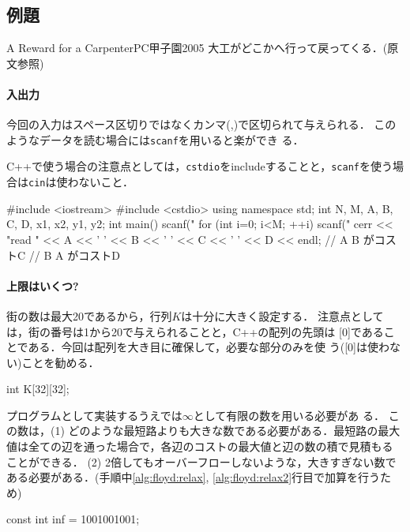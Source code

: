 \subsection{例題}

\begin{psbox}{A Reward for a Carpenter}{PC甲子園2005}
大工がどこかへ行って戻ってくる．(原文参照)
  
\end{psbox}

\paragraph{入出力}
今回の入力はスペース区切りではなくカンマ(,)で区切られて与えられる．
このようなデータを読む場合には\texttt{scanf}を用いると楽ができ
る．

C++で使う場合の注意点としては，\texttt{cstdio}をincludeすることと，\texttt{scanf}を使う場合は\texttt{cin}は使わないこと．

\begin{cbox}
#include <iostream>
#include <cstdio>
using namespace std;
int N, M, A, B, C, D, x1, x2, y1, y2;
int main() {
    scanf("
    for (int i=0; i<M; ++i) {
        scanf("
        cerr << "read " << A << ' ' << B << ' ' << C << ' ' << D
             << endl;
        // A \dingright{} B がコストC
        // B \dingright{} A がコストD
    }
}
\end{cbox}


\paragraph{上限はいくつ?}

街の数は最大20であるから，行列$K$は十分に大きく設定する．
注意点としては，街の番号は1から20で与えられることと，C++の配列の先頭は
[0]であることである．今回は配列を大き目に確保して，必要な部分のみを使
う([0]は使わない)ことを勧める．


\begin{cbox}
int K[32][32];
\end{cbox}


プログラムとして実装するうえでは$\infty$として有限の数を用いる必要があ
る．
この数は，(1) どのような最短路よりも大きな数である必要がある．最短路の最大
値は全ての辺を通った場合で，各辺のコストの最大値と辺の数の積で見積もる
ことができる． (2) 2倍してもオーバーフローしないような，大きすぎない数である必要がある．(手順中\ref{alg:floyd:relax}, \ref{alg:floyd:relax2}行目で加算を行うため)

\begin{cbox}
const int inf = 1001001001;
\end{cbox}

